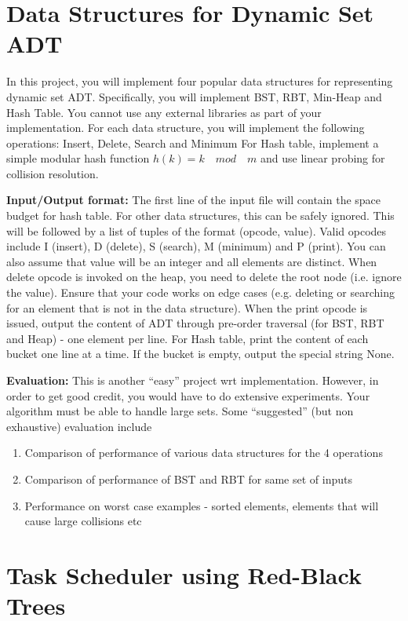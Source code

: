 \documentclass[12pt]{article}
\begin{document}
\section{Data Structures for Dynamic Set ADT}
In this project, you will implement four popular data structures for representing dynamic set ADT.
Specifically, you will implement BST, RBT, Min-Heap and Hash Table.
You cannot use any external libraries as part of your implementation.
For each data structure, you will implement the following operations: Insert, Delete, Search and Minimum
For Hash table, implement a simple modular hash function $h(k) = k \quad mod \quad m$ 
and use linear probing for collision resolution.

{\bf Input/Output format:} 
The first line of the input file will contain the space budget for hash table. For other data structures, this can be safely ignored.
This will be followed by a list of tuples of the format (opcode, value). 
Valid opcodes include I (insert), D (delete), S (search), M (minimum) and P (print).
You can also assume that value will be an integer and all elements are distinct.
When delete opcode is invoked on the heap, you need to delete the root node (i.e. ignore the value).
Ensure that your code works on edge cases (e.g. deleting or searching for an element that is not in the data structure). 
When the print opcode is issued, output the content of ADT through pre-order traversal (for BST, RBT and Heap) - one element per line.
For Hash table, print the content of each bucket one line at a time. If the bucket is empty, output the special string None. 

{\bf Evaluation:}
This is another ``easy'' project wrt implementation. 
However, in order to get good credit, you would have to do extensive experiments.
Your algorithm must be able to handle large sets.
Some ``suggested'' (but non exhaustive) evaluation include
\begin{enumerate}
    \item Comparison of performance of various data structures for the 4 operations
    \item Comparison of performance of BST and RBT for same set of inputs
    \item Performance on worst case examples - sorted elements, elements that will cause large collisions etc
\end{enumerate}



\section{Task Scheduler using Red-Black Trees}
\end{document}
